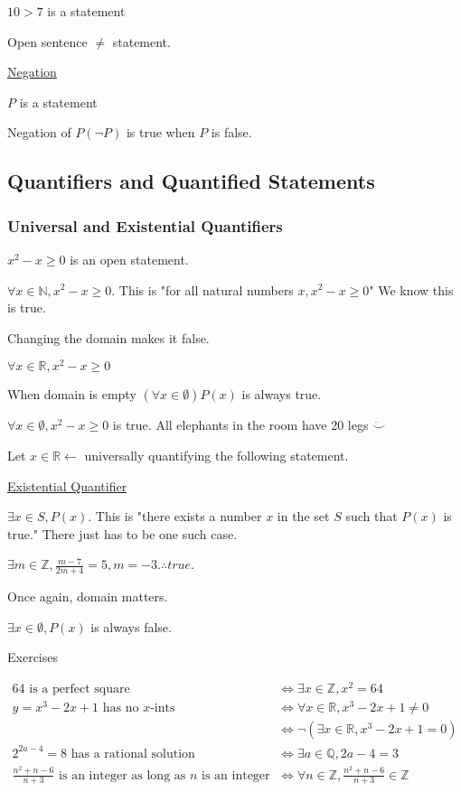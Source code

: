 \documentclass{article}
\begin{document}
$10 > 7$ is a statement

Open sentence $\ne$ statement. 

\underline{Negation}

$P$ is a statement

Negation of $P (\neg P)$ is true when $P$ is false.

\subsection{Quantifiers and Quantified Statements}

\subsubsection{Universal and Existential Quantifiers}

$x^2 - x \ge 0$ is an open statement.

$\forall x \in \mathbb{N}, x^2 - x \ge 0$. This is "for all natural numbers $x, x^2-x\ge0$" We know this is true.

Changing the domain makes it false.

$\forall x \in \mathbb{R}, x^2-x \ge 0$

When domain is empty $(\forall x \in \emptyset)P(x)$ is always true.

$\forall x \in \emptyset, x^2 - x  \ge 0$ is true. All elephants in the room have 20 legs $\ddot\smile$

Let $x \in \mathbb{R} \leftarrow$ universally quantifying the following statement.

\underline{Existential Quantifier}

$\exists x \in S, P(x)$. This is "there exists a number $x$ in the set $S$ such that $P(x)$ is true." There just has to be one such case.

$\exists m \in \mathbb{Z}, \frac{m-7}{2m+4} = 5, m = -3. \therefore true$.

Once again, domain matters. 

$\exists x \in \emptyset, P(x)$ is always false.

Exercises

\begin{align*}
    64 \text{ is a perfect square} &\iff \exists x \in \mathbb{Z}, x^2 = 64 \\
    y = x^3 - 2x + 1 \text{ has no } x \text{-ints} &\iff \forall x \in \mathbb{R}, x^3-2x+1 \ne 0 \\
    &\iff \neg(\exists x \in \mathbb{R}, x^3-2x+1=0) \\
    2^{2a-4} = 8 \text{ has a rational solution} &\iff \exists a \in \mathbb{Q}, 2a-4=3 \\
    \frac{n^2+n-6}{n+3} \text{ is an integer as long as } n \text{ is an integer} &\iff \forall n \in \mathbb{Z}, \frac{n^2+n-6}{n+3} \in \mathbb{Z}
\end{align*}
\end{document}

